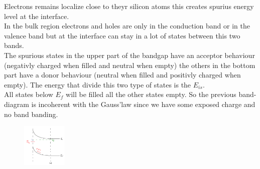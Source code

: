 Electrons remains localize close to theyr silicon atoms this creates spurius energy level at the interface.\\ 
In the bulk region electrons and holes are only in the conduction band or in the valence band but at the interface can stay in a lot of states between this two bands.\\
The spurious states in the upper part of the bandgap have an acceptor behaviour (negativly charged when filled and neutral when empty) the others in the bottom part have a donor behaviour (neutral when filled and positivly charged when empty). The energy that divide this two type of states is the $E_{is}$.\\
All states below $E_f$ will be filled all the other states empty. So the previous band-diagram is incoherent with the Gauss'law since we have some exposed charge and no band banding.\\ 

\begin{figure}
\includegraphics[width=0.19\textwidth]{is02.png}
\end{figure}

